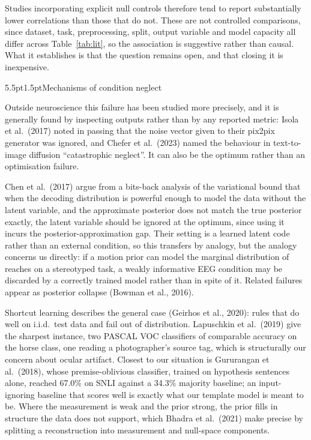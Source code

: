 \documentclass[11pt]{article}
\makeatletter
\renewcommand\section{\@startsection{section}{1}{\z@}%
  {5.5pt\@plus2pt\@minus2pt}{1.5pt}{\normalfont\large\bfseries}}
\makeatother
\begin{document}
Studies incorporating explicit null controls therefore tend to report substantially lower correlations than those that do not. These are not controlled comparisons, since dataset, task, preprocessing, split, output variable and model capacity all differ across Table~\ref{tab:lit}, so the association is suggestive rather than causal. What it establishes is that the question remains open, and that closing it is inexpensive.

\section{Mechanisms of condition neglect}

Outside neuroscience this failure has been studied more precisely, and it is generally found by inspecting outputs rather than by any reported metric: Isola et al.~(2017) noted in passing that the noise vector given to their pix2pix generator was ignored, and Chefer et al.~(2023) named the behaviour in text-to-image diffusion ``catastrophic neglect''. It can also be the optimum rather than an optimisation failure.

Chen et al.~(2017) argue from a bits-back analysis of the variational bound that when the decoding distribution is powerful enough to model the data without the latent variable, and the approximate posterior does not match the true posterior exactly, the latent variable should be ignored at the optimum, since using it incurs the posterior-approximation gap. Their setting is a learned latent code rather than an external condition, so this transfers by analogy, but the analogy concerns us directly: if a motion prior can model the marginal distribution of reaches on a stereotyped task, a weakly informative EEG condition may be discarded by a correctly trained model rather than in spite of it. Related failures appear as posterior collapse (Bowman et al., 2016).

Shortcut learning describes the general case (Geirhos et al., 2020): rules that do well on i.i.d.\ test data and fail out of distribution. Lapuschkin et al.~(2019) give the sharpest instance, two PASCAL VOC classifiers of comparable accuracy on the horse class, one reading a photographer's source tag, which is structurally our concern about ocular artifact. Closest to our situation is Gururangan et al.~(2018), whose premise-oblivious classifier, trained on hypothesis sentences alone, reached 67.0\% on SNLI against a 34.3\% majority baseline; an input-ignoring baseline that scores well is exactly what our template model is meant to be. Where the measurement is weak and the prior strong, the prior fills in structure the data does not support, which Bhadra et al.~(2021) make precise by splitting a reconstruction into measurement and null-space components.
\end{document}
